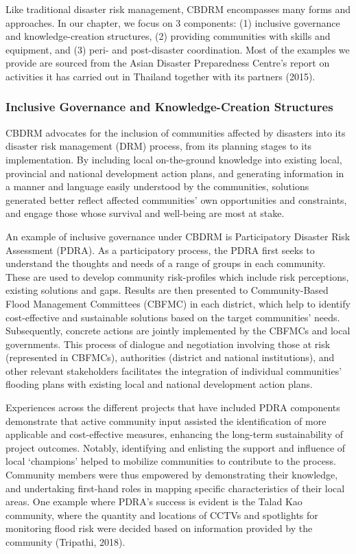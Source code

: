 Like traditional disaster risk management, CBDRM encompasses many forms and approaches. In our chapter, we focus on 3 components: (1) inclusive governance and knowledge-creation structures, (2) providing communities with skills and equipment, and (3) peri- and post-disaster coordination. Most of the examples we provide are sourced from the Asian Disaster Preparedness Centre's report on activities it has carried out in Thailand together with its partners (2015). 

\subsubsection{Inclusive Governance and Knowledge-Creation Structures} 

CBDRM advocates for the inclusion of communities affected by disasters into its disaster risk management (DRM) process, from its planning stages to its implementation. By including local on-the-ground knowledge into existing local, provincial and national development action plans,  and generating information in a manner and language easily understood by the communities, solutions generated better reflect affected communities' own opportunities and constraints, and engage those whose survival and well-being are most at stake.

An example of inclusive governance under CBDRM is Participatory Disaster Risk Assessment (PDRA). As a participatory process, the PDRA first seeks to understand the thoughts and needs of a range of groups in each community. These are used to develop community risk-profiles which include risk perceptions, existing solutions and gaps. Results are then presented to Community-Based Flood Management Committees (CBFMC) in each district, which help to identify cost-effective and sustainable solutions based on the target communities' needs. Subsequently, concrete actions are jointly implemented by the CBFMCs and local governments. This process of dialogue and negotiation involving those at risk (represented in CBFMCs), authorities (district and national institutions), and other relevant stakeholders facilitates the integration of individual communities' flooding plans with existing local and national development action plans. 

Experiences across the different projects that have included PDRA components demonstrate that active community input assisted the identification of more applicable and cost-effective measures, enhancing the long-term sustainability of project outcomes. Notably, identifying and enlisting the support and influence of local ‘champions' helped to mobilize communities to contribute to the process. Community members were thus empowered by demonstrating their knowledge, and undertaking first-hand roles in mapping specific characteristics of their local areas. One example where PDRA's success is evident is the Talad Kao community, where the quantity and locations of CCTVs and spotlights for monitoring flood risk were decided based on information provided by the community (Tripathi, 2018). 

